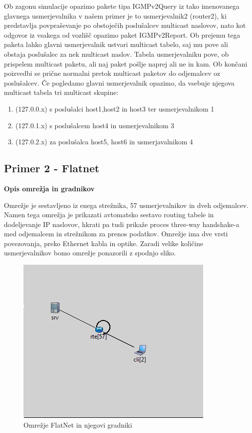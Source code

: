 \documentclass[11pt, a4paper, slovene]{book}
\begin{document}
Ob zagonu simulacije opazimo pakete tipa IGMPv2Query iz tako imenovanega glavnega usmerjevalnika v našem primer je to usmerjevalnik2 (router2), ki predstavlja povpraševanje po obstoječih poslušalcev multicast naslovov, nato kot odgovor iz vsakega od vozlišč opazimo paket IGMPv2Report. Ob prejemu tega paketa lahko glavni usmerjevalnik ustvari multicast tabelo, saj mu pove ali obstaja poslušalec za nek multicast naslov. Tabela usmerjevalniku pove, ob prispelem multicast paketu, ali naj paket pošlje naprej ali ne in kam. Ob končani poizvedbi se prične normalni pretok multicast paketov do odjemalcev oz poslušalcev. Če pogledamo glavni usmerjevalnik opazimo, da vsebuje njegova multicast tabela tri multicast skupine: 
\begin{enumerate}
	\item (127.0.0.x) s poslušalci host1,host2 in host3 ter usmerjevalnikom 1
	\item (127.0.1.x) s poslušalcem host4 in usmerjevalnikom 3
	\item (127.0.2.x) za poslušalca host5, host6 in usmerjavalnikom 4
\end{enumerate} 
\subsection{Primer 2 - Flatnet}
\large \bf Opis omrežja in gradnikov
\normalfont \normalsize 

Omrežje je sestavljeno iz enega strežnika, 57 usmerjevalnikov in dveh odjemalcev. Namen tega omrežja je prikazati avtomatsko sestavo routing tabele in dodeljevanje IP naslovov, hkrati pa tudi prikaže proces three-way handshake-a med odjemalcem in strežnikom za prenos podatkov. Omrežje ima dve vrsti povezovanja, preko Ethernet kabla in optike. Zaradi velike količine usmerjevalnikov bomo omrežje ponazorili z spodnjo sliko.
\begin{figure}[h]
	\centering
	\includegraphics{FlatNet.png}
	\caption{Omrežje FlatNet in njegovi gradniki}
	\label{flatNet}	
\end{figure}
\end{document}
